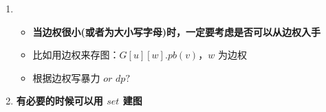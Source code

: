 \documentclass[E:/GsjzTle/main/main.tex]{subfiles}
\begin{document}
\begin{enumerate}
\def\labelenumi{\arabic{enumi}.}
\item
  \begin{itemize}
  \item
    \textbf{当边权很小(或者为大小写字母)时，一定要考虑是否可以从边权入手}
  \item
    比如用边权来存图：\(G[u][w].pb(v)\)，\(w\) 为边权
  \item
    根据边权写暴力 \(or\) \(dp?\)
  \end{itemize}
\item
  \textbf{有必要的时候可以用 \(set\) 建图}
\end{enumerate}
\end{document}
